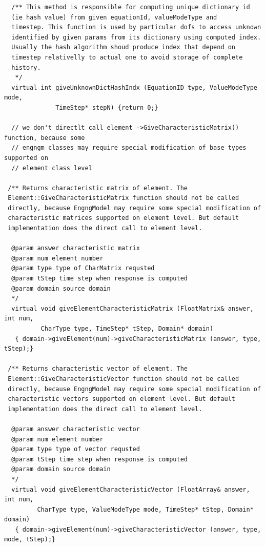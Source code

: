 \documentclass[a4paper]{article}
\begin{document}
{\begin{verbatim}
  /** This method is responsible for computing unique dictionary id
  (ie hash value) from given equationId, valueModeType and
  timestep. This function is used by particular dofs to access unknown
  identified by given params from its dictionary using computed index.
  Usually the hash algorithm shoud produce index that depend on
  timestep relativelly to actual one to avoid storage of complete
  history.
   */
  virtual int giveUnknownDictHashIndx (EquationID type, ValueModeType mode, 
              TimeStep* stepN) {return 0;}

  // we don't directlt call element ->GiveCharacteristicMatrix() function, because some
  // engngm classes may require special modification of base types supported on
  // element class level

 /** Returns characteristic matrix of element. The
 Element::GiveCharacteristicMatrix function should not be called
 directly, because EngngModel may require some special modification of
 characteristic matrices supported on element level. But default
 implementation does the direct call to element level.

  @param answer characteristic matrix
  @param num element number
  @param type type of CharMatrix requsted
  @param tStep time step when response is computed
  @param domain source domain
  */
  virtual void giveElementCharacteristicMatrix (FloatMatrix& answer, int num, 
          CharType type, TimeStep* tStep, Domain* domain) 
   { domain->giveElement(num)->giveCharacteristicMatrix (answer, type, tStep);}

 /** Returns characteristic vector of element. The
 Element::GiveCharacteristicVector function should not be called
 directly, because EngngModel may require some special modification of
 characteristic vectors supported on element level. But default
 implementation does the direct call to element level.

  @param answer characteristic vector
  @param num element number
  @param type type of vector requsted
  @param tStep time step when response is computed
  @param domain source domain
  */
  virtual void giveElementCharacteristicVector (FloatArray& answer, int num, 
         CharType type, ValueModeType mode, TimeStep* tStep, Domain* domain) 
   { domain->giveElement(num)->giveCharacteristicVector (answer, type, mode, tStep);}


\end{verbatim}}
\end{document}
